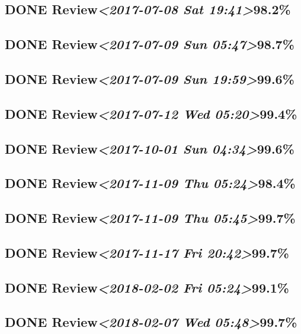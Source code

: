 \documentclass[11pt]{ctexart}
\begin{document}
\subsection{{\bfseries\sffamily DONE} Review\textit{<2017-07-08 Sat 19:41>}98.2\%}
\label{sec:org88e587d}
\subsection{{\bfseries\sffamily DONE} Review\textit{<2017-07-09 Sun 05:47>}98.7\%}
\label{sec:orga48a969}
\subsection{{\bfseries\sffamily DONE} Review\textit{<2017-07-09 Sun 19:59>}99.6\%}
\label{sec:org0ae19a7}
\subsection{{\bfseries\sffamily DONE} Review\textit{<2017-07-12 Wed 05:20>}99.4\%}
\label{sec:org43b4ebd}
\subsection{{\bfseries\sffamily DONE} Review\textit{<2017-10-01 Sun 04:34>}99.6\%}
\label{sec:orgb0334d2}

\subsection{{\bfseries\sffamily DONE} Review\textit{<2017-11-09 Thu 05:24>}98.4\%}
\label{sec:org486c0b6}
\subsection{{\bfseries\sffamily DONE} Review\textit{<2017-11-09 Thu 05:45>}99.7\%}
\label{sec:org17b019e}
\subsection{{\bfseries\sffamily DONE} Review\textit{<2017-11-17 Fri 20:42>}99.7\%}
\label{sec:org0880d0e}
\subsection{{\bfseries\sffamily DONE} Review\textit{<2018-02-02 Fri 05:24>}99.1\%}
\label{sec:orgd921c79}
\subsection{{\bfseries\sffamily DONE} Review\textit{<2018-02-07 Wed 05:48>}99.7\%}
\label{sec:org1fe9caa}
\end{document}

